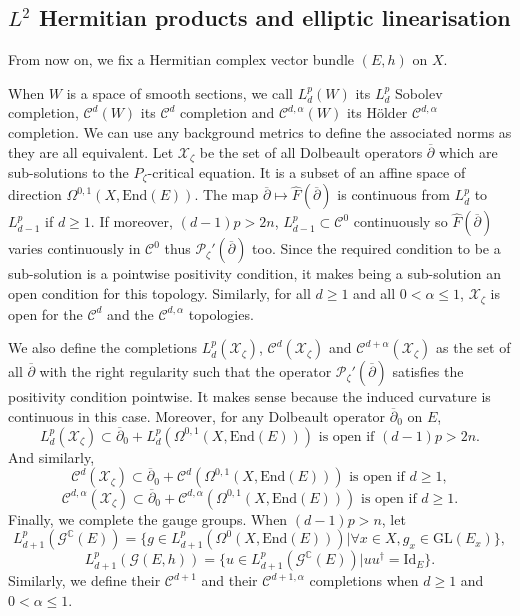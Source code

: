 \documentclass{article}
\theoremstyle{remark}
\theoremstyle{definition}
\newcommand{\C}{\mathbb{C}}
\newcommand{\End}{\mathrm{End}}
\newcommand{\GL}{\mathrm{GL}}
\newcommand{\Id}{\mathrm{Id}}
\newcommand{\G}{\mathcal{G}}
\newcommand{\mC}{\mathcal{C}}
\newcommand{\mP}{\mathcal{P}}
\newcommand{\mX}{\mathcal{X}}
\newcommand{\dbar}{\overline{\partial}}
\renewcommand{\leq}{\leqslant}
\renewcommand{\geq}{\geqslant}
\begin{document}
\subsection{$L^2$ Hermitian products and elliptic linearisation}\label{SEC:Produits scalaires}

From now on, we fix a Hermitian complex vector bundle $(E,h)$ on $X$.

When $W$ is a space of smooth sections, we call $L_d^p(W)$ its $L_d^p$ Sobolev completion, $\mC^d(W)$ its $\mC^d$ completion and $\mC^{d,\alpha}(W)$ its Hölder $\mC^{d,\alpha}$ completion. We can use any background metrics to define the associated norms as they are all equivalent. Let $\mX_\zeta$ be the set of all Dolbeault operators $\dbar$ which are sub-solutions to the $P_\zeta$-critical equation. It is a subset of an affine space of direction $\Omega^{0,1}(X,\End(E))$. The map $\dbar \mapsto \hat{F}(\dbar)$ is continuous from $L_d^p$ to $L_{d - 1}^p$ if $d \geq 1$. If moreover, $(d - 1)p > 2n$, $L_{d - 1}^p \subset \mC^0$ continuously so $\hat{F}(\dbar)$ varies continuously in $\mC^0$ thus $\mP_\zeta'(\dbar)$ too. Since the required condition to be a sub-solution is a pointwise positivity condition, it makes being a sub-solution an open condition for this topology. Similarly, for all $d \geq 1$ and all $0 < \alpha \leq 1$, $\mX_\zeta$ is open for the $\mC^d$ and the $\mC^{d,\alpha}$ topologies.

We also define the completions $L_d^p(\mX_\zeta)$, $\mC^d(\mX_\zeta)$ and $\mC^{d + \alpha}(\mX_\zeta)$ as the set of all $\dbar$ with the right regularity such that the operator $\mP_\zeta'(\dbar)$ satisfies the positivity condition pointwise. It makes sense because the induced curvature is continuous in this case. Moreover, for any Dolbeault operator $\dbar_0$ on $E$,
$$
L_d^p(\mX_\zeta) \subset \dbar_0 + L_d^p(\Omega^{0,1}(X,\End(E))) \textrm{ is open if } (d - 1)p > 2n.
$$
And similarly,
$$
\mC^d(\mX_\zeta) \subset \dbar_0 + \mC^d(\Omega^{0,1}(X,\End(E))) \textrm{ is open if } d \geq 1,
$$
$$
\mC^{d,\alpha}(\mX_\zeta) \subset \dbar_0 + \mC^{d,\alpha}(\Omega^{0,1}(X,\End(E))) \textrm{ is open if } d \geq 1.
$$
Finally, we complete the gauge groups. When $(d - 1)p > n$, let
$$
L_{d + 1}^p(\G^\C(E)) = \{g \in L_{d + 1}^p(\Omega^0(X,\End(E)))|\forall x \in X, g_x \in \GL(E_x)\},
$$
$$
L_{d + 1}^p(\G(E,h)) = \{u \in L_{d + 1}^p(\G^\C(E))|uu^\dagger = \Id_E\}.
$$
Similarly, we define their $\mC^{d + 1}$ and their $\mC^{d + 1,\alpha}$ completions when $d \geq 1$ and $0 < \alpha \leq 1$.
\end{document}
